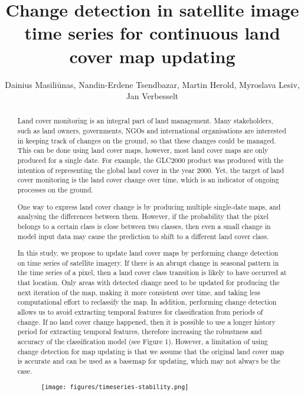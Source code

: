 \documentclass[a4paper,10pt]{article}
\title{Change detection in satellite image time series for continuous land cover map updating}
\author{Dainius Masiliūnas, Nandin-Erdene Tsendbazar, Martin Herold, Myroslava Lesiv, Jan Verbesselt}
\begin{document}
\maketitle

\begin{abstract}

Land cover monitoring is an integral part of land management. Many stakeholders, such as land owners, governments, NGOs and international organisations are interested in keeping track of changes on the ground, so that these changes could be managed. This can be done using land cover maps, however, most land cover maps are only produced for a single date. For example, the GLC2000 product was produced with the intention of representing the global land cover in the year 2000. Yet, the target of land cover monitoring is the land cover change over time, which is an indicator of ongoing processes on the ground.

One way to express land cover change is by producing multiple single-date maps, and analysing the differences between them. However, if the probability that the pixel belongs to a certain class is close between two classes, then even a small change in model input data may cause the prediction to shift to a different land cover class.

In this study, we propose to update land cover maps by performing change detection on time series of satellite imagery. If there is an abrupt change in seasonal pattern in the time series of a pixel, then a land cover class transition is likely to have occurred at that location. Only areas with detected change need to be updated for producing the next iteration of the map, making it more consistent over time, and taking less computational effort to reclassify the map. In addition, performing change detection allows us to avoid extracting temporal features for classification from periods of change. If no land cover change happened, then it is possible to use a longer history period for extracting temporal features, therefore increasing the robustness and accuracy of the classification model (see Figure 1). However, a limitation of using change detection for map updating is that we assume that the original land cover map is accurate and can be used as a basemap for updating, which may not always be the case.

 \begin{figure}
 \centering
 \texttt{[image: figures/timeseries-stability.png]}
 \label{fig:timeseries-stability}
\end{figure}


\end{abstract}
\end{document}
